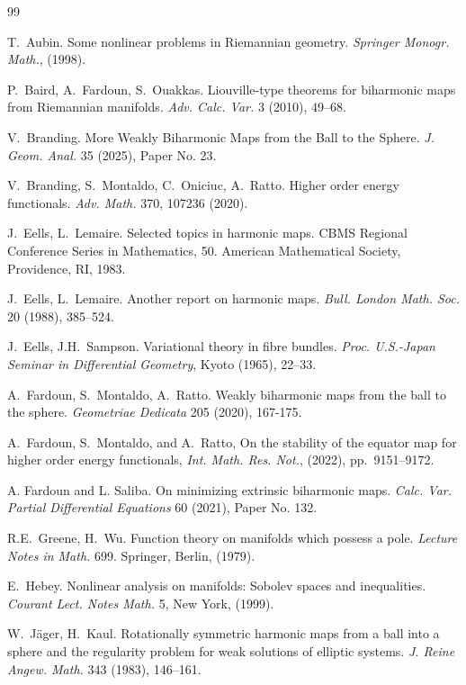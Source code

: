 \documentclass[11pt]{amsart}
\theoremstyle{plain}
\theoremstyle{definition}
\numberwithin{equation}{section}
\numberwithin{equation}{section}
\begin{document}
\begin{thebibliography}{99}

 T.~Aubin. Some nonlinear problems in Riemannian geometry. {\em Springer Monogr. Math.}, (1998). 

 P.~Baird, A.~Fardoun, S.~Ouakkas. Liouville-type theorems for biharmonic maps from Riemannian manifolds. {\it Adv. Calc. Var.} 3 (2010), 49--68. 

 V.~Branding. {More Weakly Biharmonic Maps from the Ball to the Sphere.} \textit{J. Geom. Anal.}
35 (2025), Paper No. 23.

 V.~Branding, S.~Montaldo, C.~Oniciuc, A.~Ratto. {Higher order energy functionals.} \textit{Adv. Math.}
370, 107236 (2020).

 J.~Eells, L.~Lemaire. {Selected topics in harmonic maps.} CBMS Regional Conference Series in Mathematics, 50. American Mathematical Society, Providence, RI, 1983.

 J.~Eells, L.~Lemaire. {Another report on harmonic maps}.
 {\it Bull. London Math. Soc.}  20 (1988), 385--524.

 J.~Eells, J.H.~Sampson. {Variational theory in fibre bundles}. {\em Proc. U.S.-Japan Seminar in Differential Geometry}, Kyoto (1965), 22--33.

 A.~Fardoun, S.~Montaldo, A.~Ratto. Weakly biharmonic maps from the ball to the sphere. {\em Geometriae Dedicata} 205 (2020), 167-175.

{ A.~Fardoun, S.~Montaldo, and A.~Ratto}, { On the stability of the
  equator map for higher order energy functionals}, {\em Int. Math. Res. Not.},
  (2022), pp.~9151--9172.

 A. Fardoun and L. Saliba. On minimizing extrinsic biharmonic maps. {\em Calc. Var. Partial Differential Equations} {60} (2021), Paper No. 132.


 R.E.~Greene, H.~Wu.
Function theory on manifolds which possess a pole. {\it Lecture Notes in Math.} 699. Springer, Berlin, (1979).

 E.~Hebey. {Nonlinear analysis on manifolds: Sobolev spaces and inequalities}. {\em Courant Lect. Notes Math.} 5, New York, (1999). 

 W.~J\"{a}ger, H.~Kaul. Rotationally symmetric harmonic maps from a ball into a sphere and the regularity problem for weak solutions of elliptic systems. {\it J. Reine Angew. Math.} 343 (1983), 146--161.


\end{thebibliography}
\end{document}
